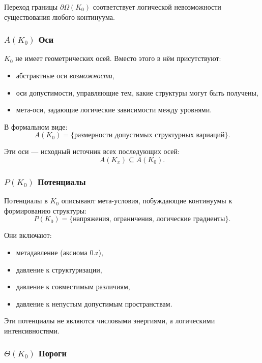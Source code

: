 Переход границы $\partial\Omega(K_0)$ соответствует логической
невозможности существования
любого континуума.

\subsubsection{\texorpdfstring{$A(K_0)$}{A(K_0)} Оси}

$K_0$ не имеет геометрических осей. Вместо этого в нём присутствуют:
\begin{itemize}
    \item абстрактные оси
\emph{возможности},
    \item оси допустимости, управляющие тем, какие структуры
          могут быть получены,
    \item мета-оси, задающие логические зависимости между уровнями.
\end{itemize}

В формальном виде:
\[
A(K_0) = \{ \text{размерности допустимых структурных вариаций} \}.
\]

Эти оси — исходный источник всех последующих осей:
\[
A(K_x) \subseteq A(K_0).
\]

\subsubsection{\texorpdfstring{$P(K_0)$}{P(K_0)} Потенциалы}

Потенциалы в $K_0$ описывают мета-условия, побуждающие континуумы к
формированию структуры:
\[
P(K_0) = \{ \text{напряжения, ограничения, логические градиенты} \}.
\]

Они включают:
\begin{itemize}
    \item метадавление (аксиома 0.z),
    \item давление к структуризации,
    \item давление к совместимым различиям,
    \item давление к непустым допустимым пространствам.
\end{itemize}

Эти потенциалы не являются числовыми энергиями, а логическими
интенсивностями.

\subsubsection{\texorpdfstring{$\Theta(K_0)$}{\Theta(K_0)} Пороги}

